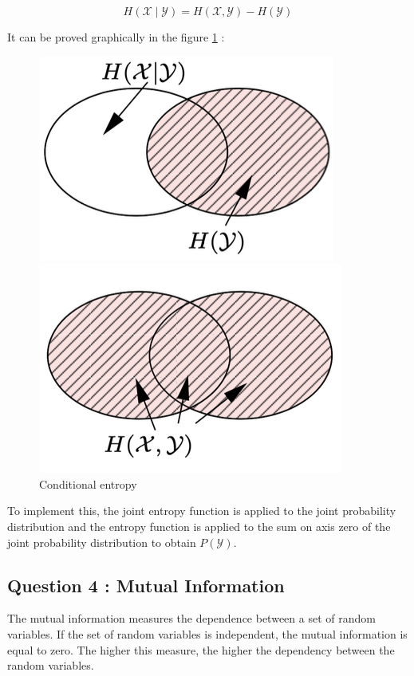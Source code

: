 \documentclass[titlepage]{article}
\begin{document}
$$H(\mathcal{X} \mid \mathcal{Y}) = H(\mathcal{X}, \mathcal{Y}) - H(\mathcal{Y})$$

\newpage

It can be proved graphically in the figure \ref{fig:condentropy} : 

\begin{figure}[h!]
    \begin{minipage}{.5\textwidth}
        \centering
        \includegraphics[scale = 0.7]{condentropy.png}
    \end{minipage}
    \hspace{0.2cm}
    \begin{minipage}{.5\textwidth}
        \centering
        \includegraphics[scale = 0.7]{jointentropy.png}
    \end{minipage}
    \caption{Conditional entropy}
    \label{fig:condentropy}
\end{figure}

To implement this, the joint entropy function is applied to the joint probability distribution and the entropy function is applied to the sum on axis zero of the joint probability distribution to obtain $P(\mathcal{Y})$. 

\subsection*{Question 4 : Mutual Information}
The mutual information measures the dependence between a set of random variables. If the set of random variables is independent, the mutual information is equal to zero. The higher this measure, the higher the dependency between the random variables. \\
\end{document}
